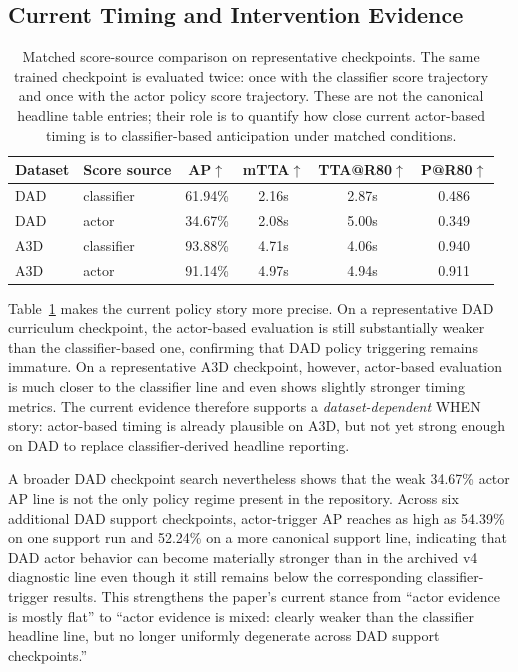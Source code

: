 \subsection{Current Timing and Intervention Evidence}

\begin{table}[t]
\caption{Matched score-source comparison on representative checkpoints. The same trained checkpoint is evaluated twice: once with the classifier score trajectory and once with the actor policy score trajectory. These are not the canonical headline table entries; their role is to quantify how close current actor-based timing is to classifier-based anticipation under matched conditions.}
\label{tab:trigger_compare}
\centering\small
\begin{tabular}{llcccc}
\toprule
Dataset & Score source & AP$\uparrow$ & mTTA$\uparrow$ & TTA@R80$\uparrow$ & P@R80$\uparrow$\\
\midrule
DAD & classifier & 61.94\% & 2.16s & 2.87s & 0.486 \\
DAD & actor & 34.67\% & 2.08s & 5.00s & 0.349 \\
\midrule
A3D & classifier & 93.88\% & 4.71s & 4.06s & 0.940 \\
A3D & actor & 91.14\% & 4.97s & 4.94s & 0.911 \\
\bottomrule
\end{tabular}
\end{table}

Table~\ref{tab:trigger_compare} makes the current policy story more precise.
On a representative DAD curriculum checkpoint, the actor-based evaluation is
still substantially weaker than the classifier-based one, confirming that DAD
policy triggering remains immature. On a representative A3D checkpoint,
however, actor-based evaluation is much closer to the classifier line and even
shows slightly stronger timing metrics. The current evidence therefore supports
a \emph{dataset-dependent} WHEN story: actor-based timing is already plausible
on A3D, but not yet strong enough on DAD to replace classifier-derived
headline reporting.

A broader DAD checkpoint search nevertheless shows that the weak 34.67\% actor
AP line is not the only policy regime present in the repository. Across six
additional DAD support checkpoints, actor-trigger AP reaches as high as
54.39\% on one support run and 52.24\% on a more canonical support line,
indicating that DAD actor behavior can become materially stronger than in the
archived v4 diagnostic line even though it still remains below the corresponding
classifier-trigger results. This strengthens the paper's current stance from
``actor evidence is mostly flat'' to ``actor evidence is mixed: clearly weaker
than the classifier headline line, but no longer uniformly degenerate across
DAD support checkpoints.''

